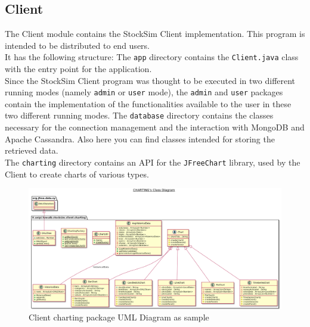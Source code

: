 \subsection{Client}
The Client module contains the StockSim Client implementation. This program is
intended to be distributed to end users.\\
It has the following structure:
\vspace{0.2cm}
\vspace{0.2cm}
\noindent The \texttt{app} directory contains the \texttt{Client.java} class
with the entry point for the application.\\
Since the StockSim Client program was thought to be executed in two different
running modes (namely \texttt{admin} or \texttt{user} mode), the \texttt{admin}
and \texttt{user} packages contain the implementation of the functionalities
available to the user in these two different running modes.
The \texttt{database} directory contains the classes necessary for the
connection management and the interaction with MongoDB and Apache Cassandra.
Also here you can find classes intended for storing the retrieved data.\\
The \texttt{charting} directory contains an API for the \texttt{JFreeChart}
library, used by the Client to create charts of various types.
\begin{figure}[H]
	\begin{center}
        \hspace*{-3.3cm}
		\includegraphics[scale=0.337]{plantuml/client/charting.png}
		\caption{Client charting package UML Diagram as sample}
	\end{center}
\end{figure}
